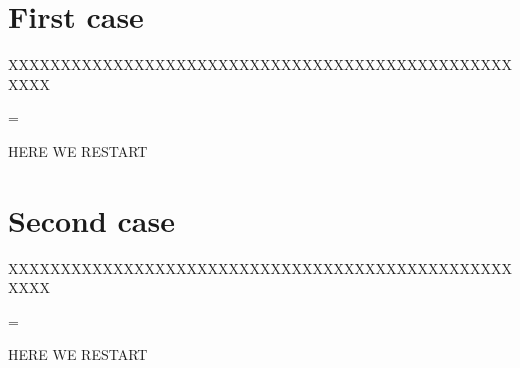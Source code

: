 \documentclass{article}
\newenvironment{absolutelynopagebreak}
  {\par\nobreak\vfil\penalty0\vfilneg
   \vtop\bgroup}
  {\par\xdef\tpd{\the\prevdepth}\egroup
   \prevdepth=\tpd}
\begin{document}
\section {First case}

\lipsum[1]

\begin{absolutelynopagebreak}
XXXXXXXXXXXXXXXXXXXXXXXXXXXXXXXXXXXXXXXXXXXXXXXXXXXX \lipsum[1-3]\lipsum*[4]
\end{absolutelynopagebreak}

HERE WE RESTART \lipsum[2]


\newpage

\section {Second case}

\lipsum[1]

\begin{absolutelynopagebreak}
XXXXXXXXXXXXXXXXXXXXXXXXXXXXXXXXXXXXXXXXXXXXXXXXXXXX \lipsum[1]\lipsum*[4]
\end{absolutelynopagebreak}

HERE WE RESTART \lipsum[2]
\end{document}

